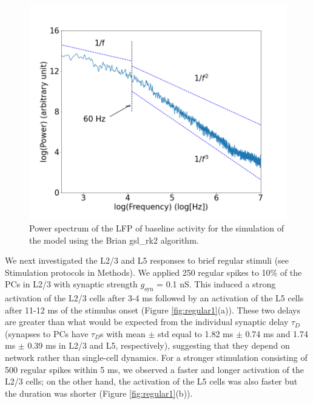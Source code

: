 \begin{figure}[H]
    \centering
    \includegraphics[scale=0.3]{LFPrk22.png}
    \caption{Power spectrum of the LFP of baseline activity for the simulation of the model using the Brian gsl\_rk2 algorithm. }
    \label{fig:LFPrk2}
\end{figure}

We next investigated the L2/3 and L5 responses to brief regular stimuli (see Stimulation protocols in Methods). We applied 250 regular spikes to 10\% of the PCs in L2/3 with synaptic strength $g_{\text{syn}}$ = 0.1 nS. This induced a strong activation of the L2/3 cells after 3-4 ms followed by an activation of the L5 cells after 11-12 ms of the stimulus onset (Figure \ref{fig:regular1}(a)). These two delays are greater than what would be expected from the individual synaptic delay $\tau_D$ (synapses to PCs have $\tau_D$s with mean $\pm$ std equal to 1.82 ms $\pm$ 0.74 ms and 1.74 ms $\pm$ 0.39 ms in L2/3 and L5, respectively), suggesting that they depend on network rather than single-cell dynamics. For a stronger stimulation consisting of 500 regular spikes within 5 ms, we observed a faster and longer activation of the L2/3 cells; on the other hand, the activation of the L5 cells was also faster but the duration was shorter (Figure \ref{fig:regular1}(b)).\\

